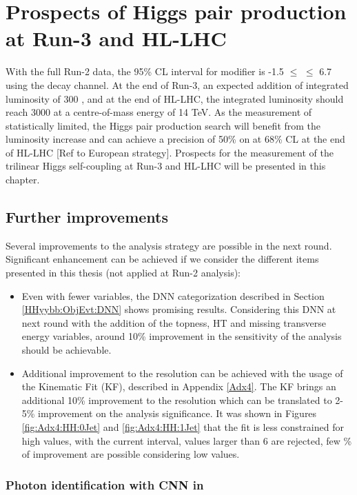 \newpage
\chapter{Prospects of Higgs pair production at Run-3 and HL-LHC}
\label{HL-LHC}

With the full Run-2 data, the 95\% CL interval for \kl modifier is -1.5 $\leq$ \kl $\leq$ 6.7 using the \HHyybb decay channel. At the end of Run-3, an expected addition of integrated luminosity of 300 \ifb, and at the end of HL-LHC, the integrated luminosity should reach 3000 \ifb at a centre-of-mass energy of 14 TeV. As the measurement of statistically limited, the Higgs pair production search will benefit from the luminosity increase and can achieve a precision of 50\% on \kl at 68\% CL at the end of HL-LHC [Ref to European strategy]. Prospects for the measurement of the trilinear Higgs self-coupling at Run-3 and HL-LHC will be presented in this chapter. 

\section{Further \HHyybb improvements}
\label{HL-LHC:Run-3}

Several improvements to the \HHyybb analysis strategy are possible in the next round. Significant enhancement can be achieved if we consider the different items presented in this thesis (not applied at Run-2 analysis):
\begin{itemize}
    \item Even with fewer variables, the DNN categorization described in Section \ref{HHyybb:ObjEvt:DNN} shows promising results. Considering this DNN at next round with the addition of the topness, HT and missing transverse energy variables, around 10\% improvement in the sensitivity of the analysis should be achievable. 
    \item Additional improvement to the \mbb resolution can be achieved with the usage of the Kinematic Fit (KF), described in Appendix \ref{Adx4}. The KF brings an additional 10\% improvement to the \mbb resolution which can be translated to 2-5\% improvement on the analysis significance. It was shown in Figures \ref{fig:Adx4:HH:0Jet} and \ref{fig:Adx4:HH:1Jet} that the fit is less constrained for high \kl values, with the current \kl interval, \kl values larger than 6 are rejected, few \% of improvement are possible considering low \kl values.
\end{itemize}

\subsection{Photon identification with CNN in \HHyybb}
\label{HL-LHC:Run-3:CNN}

